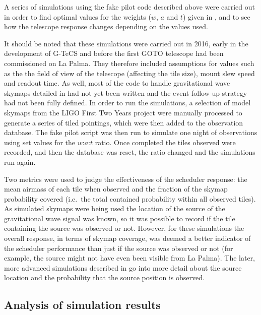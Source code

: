 \begin{colsection}
\begin{colsection}
A series of simulations using the fake pilot code described above were carried out in order to find optimal values for the weights ($w$, $a$ and $t$) given in , and to see how the telescope response changes depending on the values used.

It should be noted that these simulations were carried out in 2016, early in the development of G-TeCS and before the first GOTO telescope had been commissioned on La Palma. They therefore included assumptions for values such as the the field of view of the telescope (affecting the tile size), mount slew speed and readout time. As well, most of the code to handle gravitational wave skymaps detailed in  had not yet been written and the event follow-up strategy had not been fully defined. In order to run the simulations, a selection of model skymaps from the LIGO First Two Years project \citep{First2Years} were manually processed to generate a series of tiled pointings, which were then added to the observation database. The fake pilot script was then run to simulate one night of observations using set values for the $w$:$a$:$t$ ratio. Once completed the tiles observed were recorded, and then the database was reset, the ratio changed and the simulations run again.

Two metrics were used to judge the effectiveness of the scheduler response: the mean airmass of each tile when observed and the fraction of the skymap probability covered (i.e.\ the total contained probability within all observed tiles). As simulated skymaps were being used the location of the source of the gravitational wave signal was known, so it was possible to record if the tile containing the source was observed or not. However, for these simulations the overall response, in terms of skymap coverage, was deemed a better indicator of the scheduler performance than just if the source was observed or not (for example, the source might not have even been visible from La Palma). The later, more advanced simulations described in  go into more detail about the source location and the probability that the source position is observed.

\end{colsection}

\newpage
\subsection{Analysis of simulation results}
\label{sec:scheduler_sim_analysis}
\begin{colsection}


\end{colsection}
\end{colsection}
